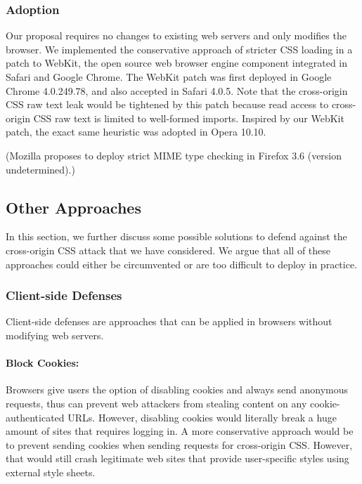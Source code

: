 \documentclass{acm_proc_article-sp}
\begin{document}
{\subsubsection{Adoption}
Our proposal requires no changes to existing web servers and only modifies the browser. We implemented the conservative approach of stricter CSS loading in a patch to WebKit, the open source web browser engine component integrated in Safari and Google Chrome. The WebKit patch was first deployed in Google Chrome 4.0.249.78, and also accepted in Safari 4.0.5. Note that the cross-origin CSS raw text leak would be tightened by this patch because read access to cross-origin CSS raw text is limited to well-formed imports. Inspired by our WebKit patch, the exact same heuristic was adopted in Opera 10.10.

(Mozilla proposes to deploy strict MIME type checking in Firefox 3.6 (version undetermined).)

\subsection{Other Approaches}
In this section, we further discuss some possible solutions to defend against the cross-origin CSS attack that we have considered. We argue that all of these approaches could either be circumvented or are too difficult to deploy in practice.

\subsubsection{Client-side Defenses}
Client-side defenses are approaches that can be applied in browsers without modifying web servers.

\paragraph{Block Cookies:}
Browsers give users the option of disabling cookies and always send anonymous requests, thus can prevent web attackers from stealing content on any cookie-authenticated URLs. However, disabling cookies would literally break a huge amount of sites that requires logging in. A more conservative approach would be to prevent sending cookies when sending requests for cross-origin CSS. However, that would still crash legitimate web sites that provide user-specific styles using external style sheets.

}
\end{document}
